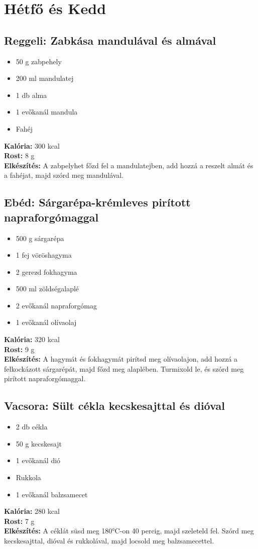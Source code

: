 \section{Hétfő és Kedd}
\sordisz
\subsection{Reggeli: Zabkása mandulával és almával}
\begin{itemize}
    \item 50 g zabpehely
    \item 200 ml mandulatej
    \item 1 db alma
    \item 1 evőkanál mandula
    \item Fahéj
\end{itemize}
\textbf{Kalória:} 300 kcal \\
\textbf{Rost:} 8 g \\
\textbf{Elkészítés:} A zabpelyhet főzd fel a mandulatejben, add hozzá a reszelt almát és a fahéjat, majd szórd meg mandulával.

\sordisz
\subsection{Ebéd: Sárgarépa-krémleves pirított napraforgómaggal}
\begin{itemize}
    \item 500 g sárgarépa
    \item 1 fej vöröshagyma
    \item 2 gerezd fokhagyma
    \item 500 ml zöldségalaplé
    \item 2 evőkanál napraforgómag
    \item 1 evőkanál olívaolaj
\end{itemize}
\textbf{Kalória:} 320 kcal \\
\textbf{Rost:} 9 g \\
\textbf{Elkészítés:} A hagymát és fokhagymát pirítsd meg olívaolajon, add hozzá a felkockázott sárgarépát, majd főzd meg alaplében. Turmixold le, és szórd meg pirított napraforgómaggal.

\sordisz
\subsection{Vacsora: Sült cékla kecskesajttal és dióval}
\begin{itemize}
    \item 2 db cékla
    \item 50 g kecskesajt
    \item 1 evőkanál dió
    \item Rukkola
    \item 1 evőkanál balzsamecet
\end{itemize}
\textbf{Kalória:} 280 kcal \\
\textbf{Rost:} 7 g \\
\textbf{Elkészítés:} A céklát süsd meg 180°C-on 40 percig, majd szeleteld fel. Szórd meg kecskesajttal, dióval és rukkolával, majd locsold meg balzsamecettel.

